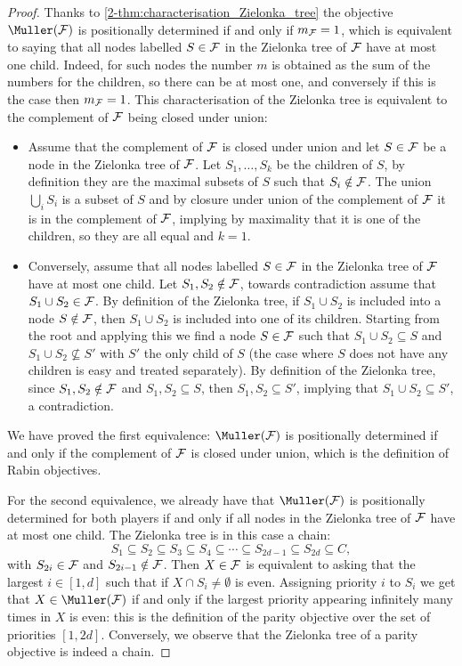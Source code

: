 \begin{proof}
Thanks to \cref{2-thm:characterisation_Zielonka_tree} the objective $\Muller(\F)$ is positionally determined if and only if $m_{\mathcal{F}} = 1$, which is equivalent to saying that all nodes labelled $S \in \mathcal{F}$ in the Zielonka tree of $\mathcal{F}$ have at most one child. Indeed, for such nodes the number $m$ is obtained as the sum of the numbers for the children, so there can be at most one, and conversely if this is the case then $m_{\mathcal{F}} = 1$.
This characterisation of the Zielonka tree is equivalent to the complement of $\mathcal{F}$ being closed under union:
\begin{itemize}
	\item Assume that the complement of $\mathcal{F}$ is closed under union and let $S \in \mathcal{F}$ be a node in the Zielonka tree of $\mathcal{F}$.
	Let $S_1,\dots,S_k$ be the children of $S$, by definition they are the maximal subsets of $S$ such that $S_i \notin \mathcal{F}$.
	The union $\bigcup_i S_i$ is a subset of $S$ and by closure under union of the complement of $\mathcal{F}$ it is in the complement of $\mathcal{F}$, 
	implying by maximality that it is one of the children, so they are all equal and $k = 1$.
	\item Conversely, assume that all nodes labelled $S \in \mathcal{F}$ in the Zielonka tree of $\mathcal{F}$ have at most one child.
	Let $S_1,S_2 \notin \mathcal{F}$, towards contradiction assume that $S_1 \cup S_2 \in \mathcal{F}$.
	By definition of the Zielonka tree, if $S_1 \cup S_2$ is included into a node $S \notin \mathcal{F}$, 
	then $S_1 \cup S_2$ is included into one of its children. 
	Starting from the root and applying this we find a node $S \in \mathcal{F}$ such that $S_1 \cup S_2 \subseteq S$
	and $S_1 \cup S_2 \not\subseteq S'$ with $S'$ the only child of $S$ 
	(the case where $S$ does not have any children is easy and treated separately).
	By definition of the Zielonka tree, since $S_1,S_2 \notin \mathcal{F}$ and $S_1,S_2 \subseteq S$, then $S_1,S_2 \subseteq S'$, implying that 
	$S_1 \cup S_2 \subseteq S'$, a contradiction.
\end{itemize}
We have proved the first equivalence: $\Muller(\F)$ is positionally determined if and only if the complement of $\mathcal{F}$ is closed under union, which is the definition of Rabin objectives.

For the second equivalence, we already have that $\Muller(\F)$ is positionally determined for both players if and only if all nodes in the Zielonka tree of $\mathcal{F}$ have at most one child. The Zielonka tree is in this case a chain:
\[
S_1 \subseteq S_2 \subseteq S_3 \subseteq S_4 \subseteq \cdots \subseteq S_{2d-1} \subseteq S_{2d} \subseteq C,
\]
with $S_{2i} \in \mathcal{F}$ and $S_{2i-1} \notin \mathcal{F}$.
Then $X \in \mathcal{F}$ is equivalent to asking that the largest $i \in [1,d]$ such that if $X \cap S_i \neq \emptyset$ is even.
Assigning priority $i$ to $S_i$ we get that $X \in \Muller(\F)$ if and only if 
the largest priority appearing infinitely many times in $X$ is even: 
this is the definition of the parity objective over the set of priorities $[1,2d]$.
Conversely, we observe that the Zielonka tree of a parity objective is indeed a chain.
\end{proof}




